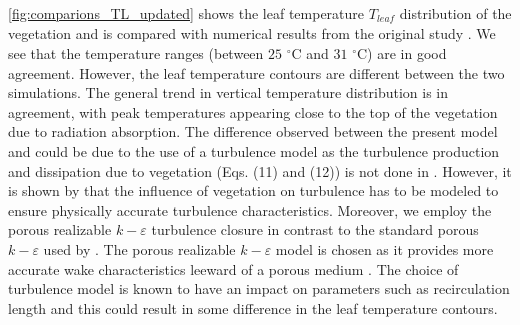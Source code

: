 \cref{fig:comparions_TL_updated} shows the leaf temperature $T_{\mathit{leaf}}$ distribution of the vegetation and is compared with numerical results from the original study \citep{Kichah2012}. We see that the temperature ranges (between $25$ $^{\circ}$C and $31$ $^{\circ}$C) are in good agreement. However, the leaf temperature contours are different between the two simulations. The general trend in vertical temperature distribution is in agreement, with peak temperatures appearing close to the top of the vegetation due to radiation absorption. The difference observed between the present model and \cite{Kichah2012} could be due to the use of a turbulence model as the turbulence production and dissipation due to vegetation (Eqs. (11) and (12)) is not done in \cite{Kichah2012}. However, it is shown by \cite{Sanz2003} that the influence of vegetation on turbulence has to be modeled to ensure physically accurate turbulence characteristics. Moreover, we employ the porous realizable $k-\varepsilon$ turbulence closure in contrast to the standard porous $k-\varepsilon$ used by \cite{Kichah2012}. The porous realizable $k-\varepsilon$ model is chosen as it provides more accurate wake characteristics leeward of a porous medium \citep{Santiago2007, Shih1995}. The choice of turbulence model is known to have an impact on parameters such as recirculation length \citep{Santiago2007} and this could result in some difference in the leaf temperature contours. 


